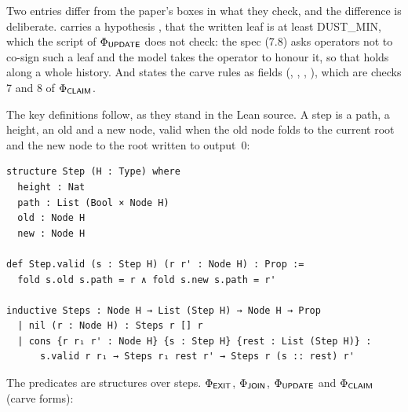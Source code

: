 Two entries differ from the paper's boxes in what they check, and the
difference is deliberate.  carries a hypothesis
, that the written leaf is at least \textsf{DUST\_MIN},
which the script of $\Phi_{\textsf{UPDATE}}$ does not check: the spec
(7.8) asks operators not to co-sign such a leaf and the model takes the
operator to honour it, so that  holds along a whole
history. And  states the carve rules as fields
(, , ,
), which are checks 7 and 8 of $\Phi_{\textsf{CLAIM}}$.

The key definitions follow, as they stand in the Lean source. A step is a
path, a height, an old and a new node, valid when the old node folds to
the current root and the new node to the root written to output~0:

\begin{lstlisting}[style=leansig]
structure Step (H : Type) where
  height : Nat
  path : List (Bool × Node H)
  old : Node H
  new : Node H

def Step.valid (s : Step H) (r r' : Node H) : Prop :=
  fold s.old s.path = r ∧ fold s.new s.path = r'

inductive Steps : Node H → List (Step H) → Node H → Prop
  | nil (r : Node H) : Steps r [] r
  | cons {r r₁ r' : Node H} {s : Step H} {rest : List (Step H)} :
      s.valid r r₁ → Steps r₁ rest r' → Steps r (s :: rest) r'
\end{lstlisting}

The predicates are structures over steps. $\Phi_{\textsf{EXIT}}$, $\Phi_{\textsf{JOIN}}$,
$\Phi_{\textsf{UPDATE}}$ and $\Phi_{\textsf{CLAIM}}$ (carve forms):

